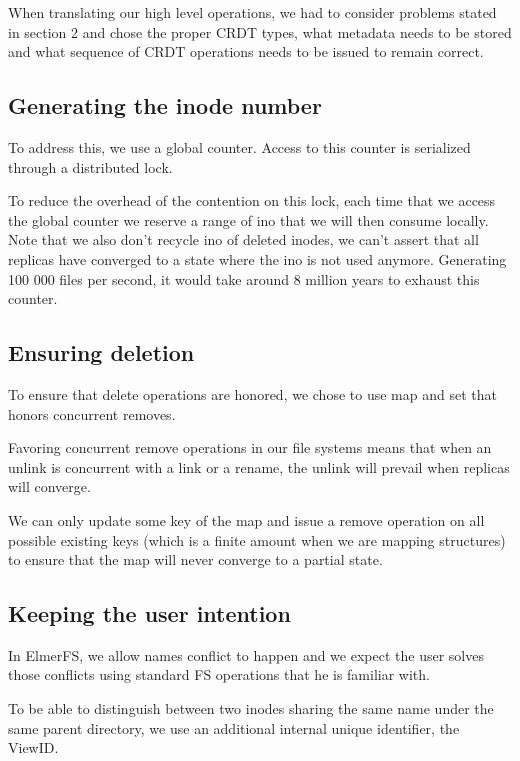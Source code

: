 \documentclass[sigconf,anonymous,10pt]{acmart}
\begin{document}
When translating our high level operations, we had to consider problems
stated in section 2 and chose the proper CRDT types,
what metadata needs to be stored and what sequence of
CRDT operations needs to be issued to remain correct.

\subsection{Generating the inode number}

To address this, we use a global counter. Access to this counter
is serialized through a distributed lock.

To reduce the overhead of the contention on this lock,
each time that we access the global counter we reserve a range of ino that
we will then consume locally.
Note that we also don’t recycle ino of deleted inodes,
we can’t assert that all replicas have converged to a state where the ino is
not used anymore. Generating 100 000 files per second, it would take around
8 million years to exhaust this counter.

\subsection{Ensuring deletion}

To ensure that delete operations are honored, we chose to use map and set that
honors concurrent removes.

Favoring concurrent remove operations in our file systems means
that when an unlink is concurrent with a link or a rename,
the unlink will prevail when replicas will converge.

We can only update some key of the map and issue a remove operation on all
possible existing keys (which is a finite amount when we are mapping
structures) to ensure that the map will never converge to a partial state.

\subsection{Keeping the user intention}

In ElmerFS, we allow names conflict to happen and we expect the user solves
those conflicts using standard FS operations that he is familiar with.

To be able to distinguish between two inodes sharing the same name under
the same parent directory, we use an additional internal unique identifier,
the ViewID.
\end{document}
